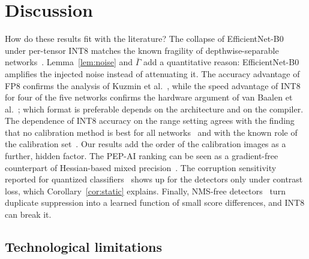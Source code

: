 \documentclass[pdflatex,sn-mathphys-num]{sn-jnl}%
\theoremstyle{thmstyleone}%
\theoremstyle{thmstyletwo}%
\theoremstyle{thmstylethree}%
\begin{document}
\section{Discussion}\label{sec:discussion}

How do these results fit with the literature? The collapse of EfficientNet-B0 under per-tensor INT8 matches the known fragility of depthwise-separable networks~\cite{sheng2018quantization,nagel2019datafree}. Lemma~\ref{lem:noise} and $\bar\Gamma$ add a quantitative reason: EfficientNet-B0 amplifies the injected noise instead of attenuating it. The accuracy advantage of FP8 confirms the analysis of Kuzmin et al.~\cite{kuzmin2022fp8}, while the speed advantage of INT8 for four of the five networks confirms the hardware argument of van Baalen et al.~\cite{vanbaalen2023fp8}; which format is preferable depends on the architecture and on the compiler. The dependence of INT8 accuracy on the range setting agrees with the finding that no calibration method is best for all networks~\cite{wu2020integer} and with the known role of the calibration set~\cite{hubara2021accurate}. Our results add the order of the calibration images as a further, hidden factor. The PEP-AI ranking can be seen as a gradient-free counterpart of Hessian-based mixed precision~\cite{dong2019hawq,yao2021hawqv3}. The corruption sensitivity reported for quantized classifiers~\cite{xiao2023robustness} shows up for the detectors only under contrast loss, which Corollary~\ref{cor:static} explains. Finally, NMS-free detectors~\cite{wang2024yolov10,zhao2024rtdetr} turn duplicate suppression into a learned function of small score differences, and INT8 can break it.

\subsection{Technological limitations}
\end{document}
